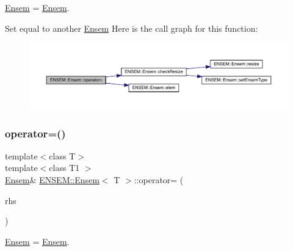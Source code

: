 \mbox{\hyperlink{classENSEM_1_1Ensem}{Ensem}} = \mbox{\hyperlink{classENSEM_1_1Ensem}{Ensem}}. 

Set equal to another \mbox{\hyperlink{classENSEM_1_1Ensem}{Ensem}} Here is the call graph for this function\+:
\nopagebreak
\begin{figure}[H]
\begin{center}
\leavevmode
\includegraphics[width=350pt]{d7/d3e/classENSEM_1_1Ensem_a2f4f881dde88dfaf425051580e477e6c_cgraph}
\end{center}
\end{figure}
\mbox{\label{classENSEM_1_1Ensem_a83f34607867df5f1fb9ad887354de48d}} 
\subsubsection{\texorpdfstring{operator=()}{operator=()}\hspace{0.1cm}{\footnotesize\ttfamily [13/15]}}
{\footnotesize\ttfamily template$<$class T$>$ \\
template$<$class T1 $>$ \\
\mbox{\hyperlink{classENSEM_1_1Ensem}{Ensem}}\& \mbox{\hyperlink{classENSEM_1_1Ensem}{E\+N\+S\+E\+M\+::\+Ensem}}$<$ T $>$\+::operator= (\begin{DoxyParamCaption}\item[{const \mbox{\hyperlink{classENSEM_1_1Ensem}{Ensem}}$<$ T1 $>$ \&}]{rhs }\end{DoxyParamCaption})\hspace{0.3cm}{\ttfamily [inline]}}



\mbox{\hyperlink{classENSEM_1_1Ensem}{Ensem}} = \mbox{\hyperlink{classENSEM_1_1Ensem}{Ensem}}. 

